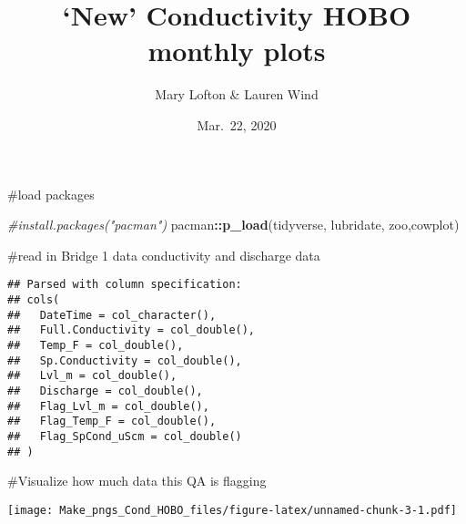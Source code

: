 \documentclass[]{article}
\title{`New' Conductivity HOBO monthly plots}
\author{Mary Lofton \& Lauren Wind}
\date{Mar.~22, 2020}
\newenvironment{Shaded}{\begin{snugshade}}{\end{snugshade}}
\newcommand{\CommentTok}[1]{\textcolor[rgb]{0.56,0.35,0.01}{\textit{#1}}}
\newcommand{\DataTypeTok}[1]{\textcolor[rgb]{0.13,0.29,0.53}{#1}}
\newcommand{\DecValTok}[1]{\textcolor[rgb]{0.00,0.00,0.81}{#1}}
\newcommand{\FloatTok}[1]{\textcolor[rgb]{0.00,0.00,0.81}{#1}}
\newcommand{\KeywordTok}[1]{\textcolor[rgb]{0.13,0.29,0.53}{\textbf{#1}}}
\newcommand{\NormalTok}[1]{#1}
\newcommand{\OperatorTok}[1]{\textcolor[rgb]{0.81,0.36,0.00}{\textbf{#1}}}
\newcommand{\StringTok}[1]{\textcolor[rgb]{0.31,0.60,0.02}{#1}}
\begin{document}
\maketitle

\#load packages

\begin{Shaded}
\begin{Highlighting}[]
\CommentTok{#install.packages("pacman")}
\NormalTok{pacman}\OperatorTok{::}\KeywordTok{p_load}\NormalTok{(tidyverse, lubridate, zoo,cowplot)}
\end{Highlighting}
\end{Shaded}

\#read in Bridge 1 data conductivity and discharge data

\begin{Shaded}
\end{Shaded}

\begin{verbatim}
## Parsed with column specification:
## cols(
##   DateTime = col_character(),
##   Full.Conductivity = col_double(),
##   Temp_F = col_double(),
##   Sp.Conductivity = col_double(),
##   Lvl_m = col_double(),
##   Discharge = col_double(),
##   Flag_Lvl_m = col_double(),
##   Flag_Temp_F = col_double(),
##   Flag_SpCond_uScm = col_double()
## )
\end{verbatim}

\#Visualize how much data this QA is flagging

\begin{Shaded}
\end{Shaded}

\texttt{[image: Make\_pngs\_Cond\_HOBO\_files/figure-latex/unnamed-chunk-3-1.pdf]}

\begin{Shaded}
\end{Shaded}
\end{document}
